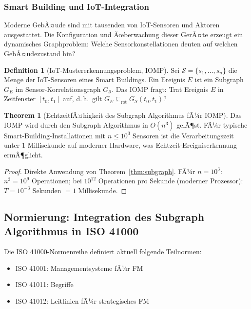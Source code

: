 ﻿\documentclass[a4paper,12pt]{article}
\theoremstyle{definition}
\newtheorem{definition}{Definition}[section]
\newtheorem{theorem}{Theorem}[section]
\begin{document}
\subsubsection{Smart Building und IoT-Integration}

Moderne GebÃ¤ude sind mit tausenden von IoT-Sensoren und Aktoren ausgestattet.
Die Konfiguration und Ãœberwachung dieser GerÃ¤te erzeugt ein dynamisches
Graphproblem: Welche Sensorkonstellationen deuten auf welchen GebÃ¤udezustand hin?

\begin{definition}[IoT-Mustererkennungsproblem, IOMP]
\label{def:iomp}
Sei $\mathcal{S} = \{s_1, \ldots, s_n\}$ die Menge der IoT-Sensoren eines
Smart Buildings. Ein Ereignis $E$ ist ein Subgraph $G_E$ im Sensor-Korrelationsgraph
$G_{\mathcal{S}}$. Das IOMP fragt: Trat Ereignis $E$ in Zeitfenster $[t_0, t_1]$ auf,
d.\,h.\ gilt $G_E \subseteq_{\mathrm{rot}} G_{\mathcal{S}}(t_0, t_1)$?
\end{definition}

\begin{theorem}[EchtzeitfÃ¤higkeit des Subgraph Algorithmus fÃ¼r IOMP]
\label{thm:iomp}
Das IOMP wird durch den Subgraph Algorithmus in $O(n^3)$ gelÃ¶st.
FÃ¼r typische Smart-Building-Installationen mit $n \leq 10^3$ Sensoren
ist die Verarbeitungszeit unter $1$ Millisekunde auf moderner Hardware,
was Echtzeit-Ereigniserkennung ermÃ¶glicht.
\end{theorem}

\begin{proof}
Direkte Anwendung von Theorem~\ref{thm:subgraph}. FÃ¼r $n = 10^3$:
$n^3 = 10^9$ Operationen; bei $10^{12}$ Operationen pro Sekunde (moderner Prozessor):
$T = 10^{-3}$ Sekunden $= 1$ Millisekunde.
\end{proof}

\subsection{Normierung: Integration des Subgraph Algorithmus in ISO 41000}

Die ISO 41000-Normenreihe definiert aktuell folgende Teilnormen:
\begin{itemize}
    \item ISO 41001: Managementsysteme fÃ¼r FM
    \item ISO 41011: Begriffe
    \item ISO 41012: Leitlinien fÃ¼r strategisches FM
\end{itemize}
\end{document}

